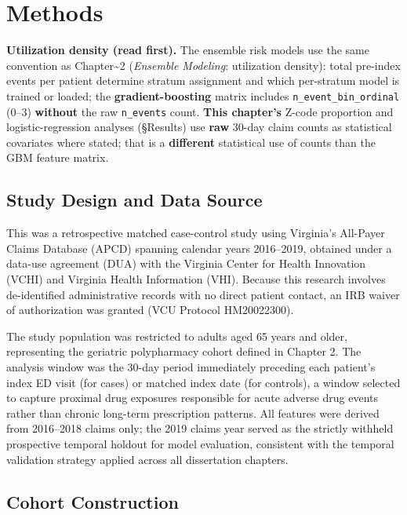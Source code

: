 \documentclass[
  12pt,
]{book}
\begin{document}
\chapter{Methods}\label{sec-methods}

\textbf{Utilization density (read first).} The ensemble risk models use
the same convention as Chapter\textasciitilde2 (\emph{Ensemble
Modeling}: utilization density): total pre-index events per patient
determine stratum assignment and which per-stratum model is trained or
loaded; the \textbf{gradient-boosting} matrix includes
\texttt{n\_event\_bin\_ordinal} (0--3) \textbf{without} the raw
\texttt{n\_events} count. \textbf{This chapter's} Z-code proportion and
logistic-regression analyses (§Results) use \textbf{raw} 30-day claim
counts as statistical covariates where stated; that is a
\textbf{different} statistical use of counts than the GBM feature
matrix.

\section{Study Design and Data
Source}\label{study-design-and-data-source-1}

This was a retrospective matched case-control study using Virginia's
All-Payer Claims Database (APCD) spanning calendar years 2016--2019,
obtained under a data-use agreement (DUA) with the Virginia Center for
Health Innovation (VCHI) and Virginia Health Information (VHI). Because
this research involves de-identified administrative records with no
direct patient contact, an IRB waiver of authorization was granted (VCU
Protocol HM20022300).

The study population was restricted to adults aged 65 years and older,
representing the geriatric polypharmacy cohort defined in Chapter 2. The
analysis window was the 30-day period immediately preceding each
patient's index ED visit (for cases) or matched index date (for
controls), a window selected to capture proximal drug exposures
responsible for acute adverse drug events rather than chronic long-term
prescription patterns. All features were derived from 2016--2018 claims
only; the 2019 claims year served as the strictly withheld prospective
temporal holdout for model evaluation, consistent with the temporal
validation strategy applied across all dissertation chapters.

\section{Cohort Construction}\label{sec-cohort}
\end{document}
